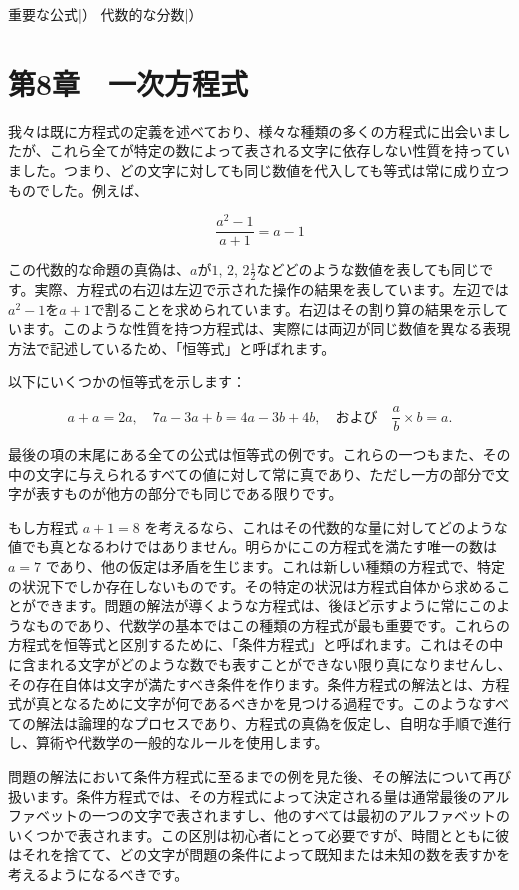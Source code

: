 \documentclass[a4paper,11pt,openany]{ltjsbook}
\begin{document}
重要な公式|）  
代数的な分数|）

\chapter{第8章　一次方程式}

我々は既に方程式の定義を述べており、様々な種類の多くの方程式に出会いましたが、これら全てが特定の数によって表される文字に依存しない性質を持っていました。つまり、どの文字に対しても同じ数値を代入しても等式は常に成り立つものでした。例えば、

\[
\frac{a^{2} - 1}{a + 1} = a - 1
\]

この代数的な命題の真偽は、$a$が$1$, $2$, $2\frac{1}{2}$などどのような数値を表しても同じです。実際、方程式の右辺は左辺で示された操作の結果を表しています。左辺では$a^{2} - 1$を$a + 1$で割ることを求められています。右辺はその割り算の結果を示しています。このような性質を持つ方程式は、実際には両辺が同じ数値を異なる表現方法で記述しているため、「恒等式」と呼ばれます。

以下にいくつかの恒等式を示します：

\[
a + a = 2a, \quad
7a - 3a + b = 4a - 3b + 4b, \quad \text{および} \quad
\frac{a}{b} × b = a.
\]

最後の項の末尾にある全ての公式は恒等式の例です。これらの一つもまた、その中の文字に与えられるすべての値に対して常に真であり、ただし一方の部分で文字が表すものが他方の部分でも同じである限りです。

もし方程式 $a + 1 = 8$ を考えるなら、これはその代数的な量に対してどのような値でも真となるわけではありません。明らかにこの方程式を満たす唯一の数は $a = 7$ であり、他の仮定は矛盾を生じます。これは新しい種類の方程式で、特定の状況下でしか存在しないものです。その特定の状況は方程式自体から求めることができます。問題の解法が導くような方程式は、後ほど示すように常にこのようなものであり、代数学の基本ではこの種類の方程式が最も重要です。これらの方程式を恒等式と区別するために、「条件方程式」と呼ばれます。これはその中に含まれる文字がどのような数でも表すことができない限り真になりませんし、その存在自体は文字が満たすべき条件を作ります。条件方程式の解法とは、方程式が真となるために文字が何であるべきかを見つける過程です。このようなすべての解法は論理的なプロセスであり、方程式の真偽を仮定し、自明な手順で進行し、算術や代数学の一般的なルールを使用します。

問題の解法において条件方程式に至るまでの例を見た後、その解法について再び扱います。条件方程式では、その方程式によって決定される量は通常最後のアルファベットの一つの文字で表されますし、他のすべては最初のアルファベットのいくつかで表されます。この区別は初心者にとって必要ですが、時間とともに彼はそれを捨てて、どの文字が問題の条件によって既知または未知の数を表すかを考えるようになるべきです。
\end{document}
